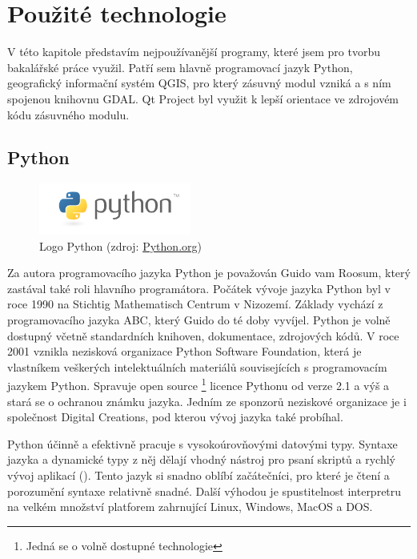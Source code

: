 \chapter{Použité technologie}
\label{3-technologie}
V této kapitole představím nejpoužívanější programy, které jsem pro tvorbu bakalářské práce využil. Patří sem hlavně programovací jazyk Python, geografický informační systém QGIS, pro který zásuvný modul vzniká a s ním spojenou knihovnu GDAL. Qt Project byl využit k lepší orientace ve zdrojovém kódu zásuvného modulu.

\section{Python}

\begin{figure}[H]
	 \centering
      \includegraphics[width=5cm]{./pictures/python-logo.png}
      \caption{Logo Python (zdroj:
\href{https://www.python.org/static/community_logos/python-logo-master-v3-TM.png}{Python.org})}
      \label{fig:python}
  \end{figure}
  
Za autora programovacího jazyka Python je považován Guido vam Roosum, který zastával také roli hlavního programátora. Počátek vývoje jazyka Python byl v roce 1990 na Stichtig Mathematisch Centrum v Nizozemí. Základy vychází z programovacího jazyka ABC, který Guido do té doby vyvíjel. Python je volně dostupný včetně standardních knihoven, dokumentace, zdrojových kódů. V roce 2001 vznikla nezisková organizace Python Software Foundation, která je vlastníkem veškerých intelektuálních materiálů souvisejících s programovacím jazykem Python. Spravuje open source \footnote{Jedná se o volně dostupné technologie} licence Pythonu od verze 2.1 a výš a stará se o ochranou známku jazyka. Jedním ze sponzorů neziskové organizace je i společnost Digital Creations, pod kterou vývoj jazyka také probíhal.

Python účinně a efektivně pracuje s vysokoúrovňovými datovými typy. Syntaxe jazyka a dynamické typy z něj dělají vhodný nástroj pro psaní skriptů a rychlý vývoj aplikací (). Tento jazyk si snadno oblíbí začátečníci, pro které je čtení a porozumění syntaxe relativně snadné. Další výhodou je spustitelnost interpretru na velkém množství platforem zahrnující Linux, Windows, MacOS a DOS. \cite{ucebnicepython, python}

